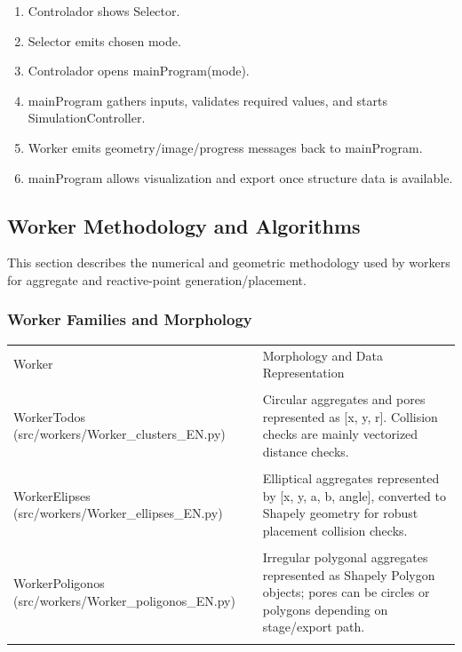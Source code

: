 ﻿\documentclass[11pt,a4paper]{article}
\begin{document}
\begin{enumerate}
\item Controlador shows Selector.
\item Selector emits chosen mode.
\item Controlador opens mainProgram(mode).
\item mainProgram gathers inputs, validates required values, and starts SimulationController.
\item Worker emits geometry/image/progress messages back to mainProgram.
\item mainProgram allows visualization and export once structure data is available.
\end{enumerate}

\subsection*{Worker Methodology and Algorithms}

This section describes the numerical and geometric methodology used by workers for aggregate and reactive-point generation/placement.


\subsubsection*{Worker Families and Morphology}

\begin{longtable}{|p{}|p{}|}
\hline
Worker & Morphology and Data Representation \\\\
\hline
WorkerTodos (src/workers/Worker\_clusters\_EN.py) & Circular aggregates and pores represented as [x, y, r]. Collision checks are mainly vectorized distance checks. \\\\
\hline
WorkerElipses (src/workers/Worker\_ellipses\_EN.py) & Elliptical aggregates represented by [x, y, a, b, angle], converted to Shapely geometry for robust placement collision checks. \\\\
\hline
WorkerPoligonos (src/workers/Worker\_poligonos\_EN.py) & Irregular polygonal aggregates represented as Shapely Polygon objects; pores can be circles or polygons depending on stage/export path. \\\\
\hline
\end{longtable}
\end{document}
